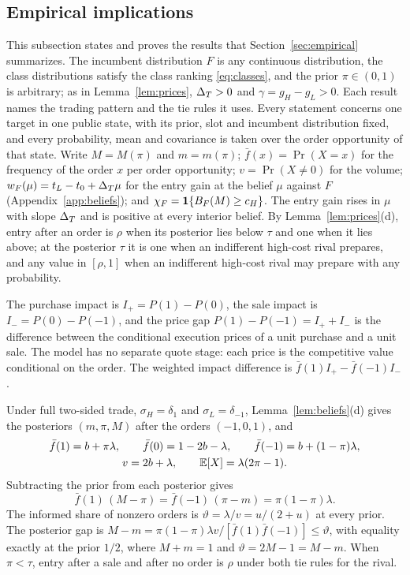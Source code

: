 \subsection{Empirical implications}\label{app:empirical}

This subsection states and proves the results that Section~\ref{sec:empirical} summarizes. The incumbent distribution \(F\)
is any continuous distribution, the class distributions satisfy the class ranking \eqref{eq:classes}, and the prior \(\pi\in(0,1)\) is
arbitrary; as in Lemma~\ref{lem:prices}, \(\Delta_T>0\) and \(\gamma=g_H-g_L>0\). Each result names the trading pattern
and the tie rules it uses. Every statement concerns one target in one public state, with its prior, slot and
incumbent distribution fixed, and every probability, mean and covariance is taken over the order opportunity of that state.
Write \(M=M(\pi)\) and \(m=m(\pi)\); \(\bar f(x)=\Pr(X=x)\) for the frequency of the order \(x\) per order
opportunity; \(v=\Pr(X\ne0)\) for the volume; \(w_F(\mu)=t_L-t_0+\Delta_T\mu\) for the entry gain at the belief \(\mu\)
against \(F\) (Appendix~\ref{app:beliefs}); and \(\chi_F=\mathbf{1}\{B_F(M)\ge c_H\}\). The entry gain rises in \(\mu\) with
slope \(\Delta_T\) and is positive at every interior belief. By Lemma~\ref{lem:prices}(d), entry after an order is \(\rho\)
when its posterior lies below \(\tau\) and one when it lies above; at the posterior \(\tau\) it is one when an
indifferent high-cost rival prepares, and any value in \([\rho,1]\) when an indifferent high-cost rival
may prepare with any probability.

The purchase impact is \(I_+=P(1)-P(0)\), the sale impact is \(I_-=P(0)-P(-1)\), and the price gap
\(P(1)-P(-1)=I_++I_-\) is the difference between the conditional execution prices of a unit purchase and a unit
sale. The model has no separate quote stage: each price is the competitive value conditional on the order. The
weighted impact difference is \(\bar f(1)I_+-\bar f(-1)I_-\).

Under full two-sided trade, \(\sigma_H=\delta_1\) and \(\sigma_L=\delta_{-1}\), Lemma~\ref{lem:beliefs}(d) gives
the posteriors \((m,\pi,M)\) after the orders \((-1,0,1)\), and
\begin{equation}\label{eq:a8-full}
\begin{gathered}
\bar f(1)=b+\pi\lambda,\qquad \bar f(0)=1-2b-\lambda,\qquad \bar f(-1)=b+(1-\pi)\lambda,\\
v=2b+\lambda,\qquad \mathbb{E}[X]=\lambda(2\pi-1).
\end{gathered}
\end{equation}
Subtracting the prior from each posterior gives
\begin{equation}\label{eq:a8-balance}
\bar f(1)\,(M-\pi)=\bar f(-1)\,(\pi-m)=\pi(1-\pi)\lambda .
\end{equation}
The informed share of nonzero orders is \(\vartheta=\lambda/v=u/(2+u)\) at every prior. The posterior gap is
\(M-m=\pi(1-\pi)\lambda v/[\bar f(1)\bar f(-1)]\le\vartheta\), with equality exactly at the prior \(1/2\), where \(M+m=1\)
and \(\vartheta=2M-1=M-m\). When \(\pi<\tau\), entry after a sale and after no order is \(\rho\) under both tie rules for the rival.

